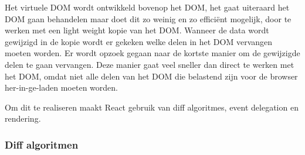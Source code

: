 	Het virtuele DOM wordt ontwikkeld bovenop het DOM, het gaat uiteraard het DOM gaan behandelen maar doet dit zo weinig en zo efficiënt mogelijk, door te werken met een light weight kopie van het DOM. Wanneer de data wordt gewijzigd in de kopie wordt er gekeken welke delen in het DOM vervangen moeten worden. Er wordt opzoek gegaan naar de kortste manier om de gewijzigde delen te gaan vervangen. Deze manier gaat veel sneller dan direct te werken met het DOM, omdat niet alle delen van het DOM die belastend zijn voor de browser her-in-ge-laden moeten worden.\citep{gackenheimer:react}
	
	Om dit te realiseren maakt React gebruik van diff algoritmes, event delegation en rendering.
	
	\subsubsection{Diff algoritmen}
		
